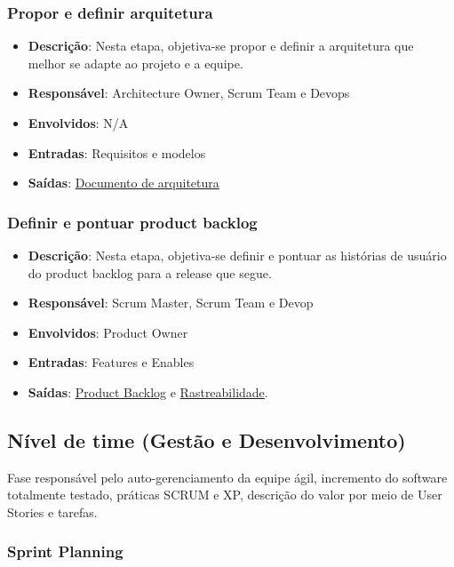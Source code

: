 \subsubsection{Propor e definir arquitetura}

\begin{itemize}
  \item \textbf{Descrição}: Nesta etapa, objetiva-se propor e definir a arquitetura que melhor se adapte ao projeto e a equipe.
  \item \textbf{Responsável}: Architecture Owner, Scrum Team e Devops
  \item \textbf{Envolvidos}: N/A
  \item \textbf{Entradas}: Requisitos e modelos
  \item \textbf{Saídas}: \href{https://victorarnaud.github.io/TBL/contribuicao/arquitetura/}{Documento de arquitetura}
\end{itemize}

\subsubsection{Definir e pontuar product backlog}

\begin{itemize}
  \item \textbf{Descrição}: Nesta etapa, objetiva-se definir e pontuar as histórias de usuário do product backlog para a release que segue.
  \item \textbf{Responsável}: Scrum Master, Scrum Team e Devop
  \item \textbf{Envolvidos}: Product Owner
  \item \textbf{Entradas}: Features e Enables
  \item \textbf{Saídas}: \href{https://github.com/VictorArnaud/TBL/wiki/Product-Backlog}{Product Backlog} e \href{https://github.com/VictorArnaud/TBL/wiki/Rastreabilidade-de-requisitos}{Rastreabilidade}.
\end{itemize}

\subsection{Nível de time (Gestão e Desenvolvimento)}

Fase responsável pelo auto-gerenciamento da equipe ágil, incremento do software totalmente testado, práticas SCRUM e XP, descrição do valor por meio de User Stories e tarefas.

\subsubsection{Sprint Planning}

